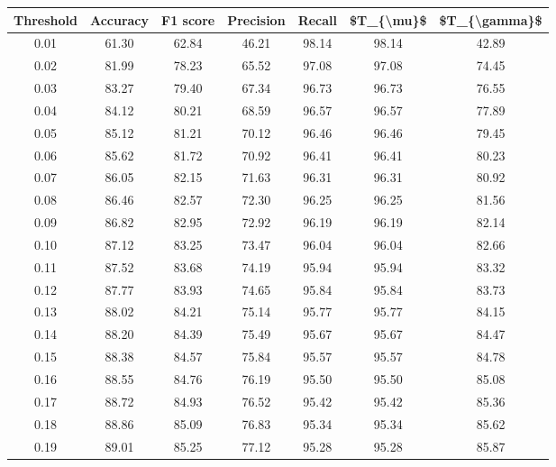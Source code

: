 \begin{tabular}{|c|c|c|c|c|c|c|}
\hline
 Threshold &  Accuracy &  F1 score &  Precision &  Recall &  \$T\_\{\textbackslash mu\}\$ &  \$T\_\{\textbackslash gamma\}\$ \\
\hline
      0.01 &     61.30 &     62.84 &      46.21 &   98.14 &      98.14 &         42.89 \\
      0.02 &     81.99 &     78.23 &      65.52 &   97.08 &      97.08 &         74.45 \\
      0.03 &     83.27 &     79.40 &      67.34 &   96.73 &      96.73 &         76.55 \\
      0.04 &     84.12 &     80.21 &      68.59 &   96.57 &      96.57 &         77.89 \\
      0.05 &     85.12 &     81.21 &      70.12 &   96.46 &      96.46 &         79.45 \\
      0.06 &     85.62 &     81.72 &      70.92 &   96.41 &      96.41 &         80.23 \\
      0.07 &     86.05 &     82.15 &      71.63 &   96.31 &      96.31 &         80.92 \\
      0.08 &     86.46 &     82.57 &      72.30 &   96.25 &      96.25 &         81.56 \\
      0.09 &     86.82 &     82.95 &      72.92 &   96.19 &      96.19 &         82.14 \\
      0.10 &     87.12 &     83.25 &      73.47 &   96.04 &      96.04 &         82.66 \\
      0.11 &     87.52 &     83.68 &      74.19 &   95.94 &      95.94 &         83.32 \\
      0.12 &     87.77 &     83.93 &      74.65 &   95.84 &      95.84 &         83.73 \\
      0.13 &     88.02 &     84.21 &      75.14 &   95.77 &      95.77 &         84.15 \\
      0.14 &     88.20 &     84.39 &      75.49 &   95.67 &      95.67 &         84.47 \\
      0.15 &     88.38 &     84.57 &      75.84 &   95.57 &      95.57 &         84.78 \\
      0.16 &     88.55 &     84.76 &      76.19 &   95.50 &      95.50 &         85.08 \\
      0.17 &     88.72 &     84.93 &      76.52 &   95.42 &      95.42 &         85.36 \\
      0.18 &     88.86 &     85.09 &      76.83 &   95.34 &      95.34 &         85.62 \\
      0.19 &     89.01 &     85.25 &      77.12 &   95.28 &      95.28 &         85.87 \\

\end{tabular}
